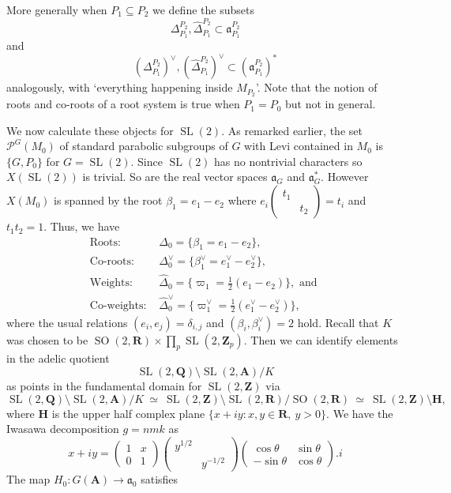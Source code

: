 \documentclass[11pt]{amsart}
\def\A{\mathbf A}
\def\Q{\mathbf Q}
\def\R{\mathbf R}
\def\Z{\mathbf Z}
\def\PPP{\mathcal P}
\def\aaa{\mathfrak a}
\def\cb#1{{\color{black}#1}}
\def\bs{\setminus} 			%
\def\se{\subseteq}
\def\sl{\operatorname{SL}}
\def\so{\operatorname{SO}}
\theoremstyle{remark}
\begin{document}
More generally when $P_1 \se P_2$ we define the subsets
\[ \Delta_{P_1}^{P_2}, \hat\Delta_{P_1}^{P_2} \subset \aaa_{P_1}^{P_2} \]
and
\[ (\Delta_{P_1}^{P_2})^\vee, (\hat\Delta_{P_1}^{P_2})^\vee \subset (\aaa_{P_1}^{P_2})^* \]
analogously, with `everything happening inside $M_{P_2}$'. Note that the notion of roots and co-roots of a root system is true when $P_1 = P_0$ but not in general. 

\cb{
We now calculate these objects for $\sl (2)$. As remarked earlier, the set $\PPP^G(M_0)$ of standard parabolic subgroups of $G$ with Levi contained in $M_0$ is $\{G, P_0\}$ for $G = \sl(2)$. Since $\sl(2)$ has no nontrivial characters so $X(\sl(2))$ is trivial. So are the real vector spaces $\aaa_G$ and $\aaa_G^*$. However $X(M_0)$ is spanned by the root $\beta_1 = e_1 - e_2$ where $e_i\begin{pmatrix} t_1 & \\ & t_2 \end{pmatrix} = t_i$ and $t_1 t_2 = 1$. 
Thus, we have}
\cb{\begin{align*}
	 \text{Roots: } & \Delta_0 = \{\beta_1 = e_1 - e_2 \}, \\
	 \text{Co-roots: } & \Delta_0^\vee = \{ \beta_1^\vee = e_1^\vee - e_2^\vee \}, \\
	 \text{Weights: } & \hat\Delta_0 = \{ \varpi_1 = \frac{1}{2}(e_1 - e_2) \}, \text{ and } \\
	 \text{Co-weights: } & \hat\Delta_0^\vee = \{ \varpi_1^\vee = \frac{1}{2}(e_1^\vee - e_2^\vee) \},
\end{align*}
where the usual relations $(e_i, e_j) = \delta_{i, j}$ and $(\beta_i, \beta_i^\vee) = 2$ hold. 
}
\cb{
Recall that $K$ was chosen to be $\so(2, \R) \times \displaystyle\prod_p \sl(2, \Z_p)$. Then we can identify elements in the adelic quotient 
\[ \sl(2, \Q) \bs \sl(2, \A) / K \]
as points in the fundamental domain for $\sl(2, \Z)$ via
\begin{equation} \label{fund_dom} 
\sl(2, \Q) \bs \sl(2, \A) / K \ \simeq \ \sl(2, \Z) \bs \sl(2, \R) / \so(2, \R) \ 
		\simeq \ \sl(2, \Z) \bs \mathbf H,
\end{equation}
where $\mathbf H$ is the upper half complex plane $\{ x + i y : x, y \in \R, \ y > 0\}$. We have the Iwasawa decomposition $g = nmk$ as 
\[ x + i y = \begin{pmatrix} 1 & x \\ 0 & 1 \end{pmatrix} \begin{pmatrix} y^{1/2} & \\ & y^{-1/2} \end{pmatrix}
		\begin{pmatrix} \cos \theta & \sin \theta \\ -\sin \theta & \cos \theta \end{pmatrix} . i \]
The map $H_0 : G(\A) \to \aaa_0$ satisfies}
\end{document}
